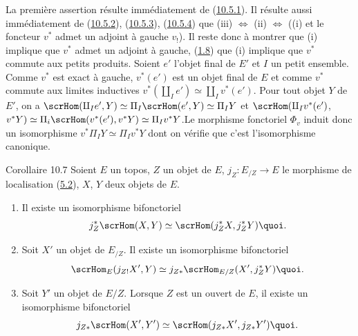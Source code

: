 \documentclass[10pt]{../fichiers-configuration-latex/smfart}
\begin{document}
\subsubsection{}
La première assertion résulte immédiatement de
(\hyperref[IV.subsubsec10.5.1]{10.5.1}). Il résulte aussi immédiatement de
(\hyperref[IV.subsubsec10.5.2]{10.5.2}), (\hyperref[IV.subsubsec10.5.3]{10.5.3}),
(\hyperref[IV.subsubsec10.5.4]{10.5.4}) que (iii) $\Leftrightarrow$ (ii)
$\Leftrightarrow$ ((i) et le foncteur $v^{\ast}$ admet un adjoint à
gauche $v_{!}$). Il reste donc à montrer que (i) implique que
$v^{\ast}$ admet un adjoint à gauche, \ie (\hyperref[IV.rem1.8]{1.8}) que (i)
implique que $v^{\ast}$ commute aux petits produits. Soient $e'$
l'objet final de $E'$ et $I$ un petit ensemble. Comme $v^{\ast}$ est
exact à gauche, $v^{\ast}(e')$ est un objet final de $E$ et comme
$v^{\ast}$ commute aux limites inductives $v^{\ast}(\amalg_I
e')\simeq \amalg_I v^{\ast}(e')$. Pour tout objet $Y$ de $E'$, on a
$\scrHom(\amalg_I e', Y)\simeq \Pi_I\scrHom(e',Y)\simeq \Pi_I Y$ et
$\scrHom(\amalg_I v^{\ast}(e')$, $v^{\ast}Y)\simeq
\Pi_i\scrHom(v^{\ast}(e'), v^{\ast}Y)\simeq \Pi_I
v^{\ast}Y$.\pageoriginale Le morphisme fonctoriel $\Phi_v$ induit
donc un isomorphisme $v^{\ast}\Pi_I Y\simeq \Pi_I v^{\ast}Y$ dont on
vérifie que c'est l'isomorphisme canonique. \cqfd

\begin{enonce*}{Corollaire 10.7}
Soient $E$ un topos, $Z$ un objet de $E$, $j_Z:E_{/Z}\rightarrow E$
le morphisme de localisation (\hyperref[IV.subsec5.2]{5.2}), $X$, $Y$
deux objets de $E$.
\begin{enumerate}
\renewcommand{\labelenumi}{\theenumi)}
\item Il existe un isomorphisme bifonctoriel
$$
j^{\ast}_Z\scrHom(X,Y)\simeq \scrHom(j^{\ast}_ZX,
j^{\ast}_ZY){\quoi}.
$$

\item Soit $X'$ un objet de $E_{/Z}$. Il existe un isomorphisme
bifonctoriel
$$
\scrHom_E(j_{Z!}X',Y)\simeq j_{Z\ast}\scrHom_{E/Z}(X',j^{\ast}_Z
Y){\quoi}.
$$

\item Soit $Y'$ un objet de $E/Z$. Lorsque $Z$ est un ouvert de $E$,
il existe un isomorphisme bifonctoriel
$$
j_{Z\ast}\scrHom(X',Y')\simeq \scrHom(j_{Z\ast}X',
j_{Z\ast}Y'){\quoi}.
$$
\end{enumerate}
\end{enonce*}
\end{document}
